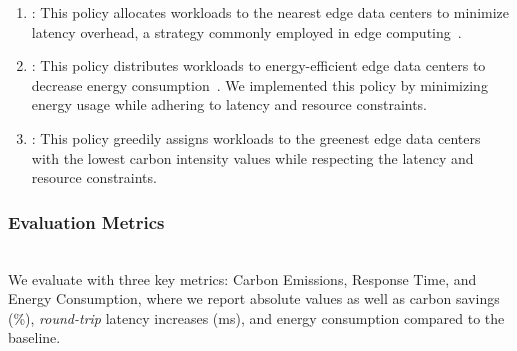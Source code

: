 \begin{enumerate}[leftmargin=*]
\item {\bf \latencyaware}: This policy allocates workloads to the nearest edge data centers to minimize latency overhead, a strategy commonly employed in edge computing~\cite{yi2017:Lavea}.

\item {\bf \energyaware}: This policy distributes workloads to energy-efficient edge data centers to decrease energy consumption~\cite{Goudarzi21Placement, Li2018_energy_placement}. We implemented this policy by minimizing energy usage while adhering to latency and resource constraints. 
 
\item {\bf \intensityaware}: This policy greedily assigns workloads to the greenest edge data centers with the lowest carbon intensity values while respecting the latency and resource constraints. 


\end{enumerate}  



\subsubsection{Evaluation Metrics} \hfill\\
We evaluate \proposedsystem with three key metrics: Carbon Emissions, Response Time, and Energy Consumption, where we report absolute values as well as carbon savings (\%), {\em round-trip} latency increases (ms), and energy consumption compared to the \latencyaware baseline. 


    

